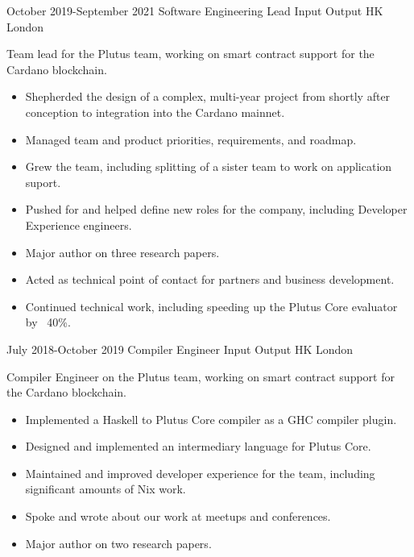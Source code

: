 \documentclass[12pt,a4paper,sans]{moderncv}
\begin{document}
\cventry
{October 2019-September 2021}
{Software Engineering Lead}
{Input Output HK}
{London}
{}
{
  Team lead for the Plutus team, working on smart contract support for the Cardano blockchain.
  \begin{itemize}
    \item Shepherded the design of a complex, multi-year project from shortly after conception to integration into the Cardano mainnet.
    \item Managed team and product priorities, requirements, and roadmap.
    \item Grew the team, including splitting of a sister team to work on application suport.
    \item Pushed for and helped define new roles for the company, including Developer Experience engineers.
    \item Major author on three research papers.
    \item Acted as technical point of contact for partners and business development.
    \item Continued technical work, including speeding up the Plutus Core evaluator by ~40\%.
  \end{itemize}
}

\cventry
{July 2018-October 2019}
{Compiler Engineer}
{Input Output HK}
{London}
{}
{
  Compiler Engineer on the Plutus team, working on smart contract support for the Cardano blockchain.
  \begin{itemize}
    \item Implemented a Haskell to Plutus Core compiler as a GHC compiler plugin.
    \item Designed and implemented an intermediary language for Plutus Core.
    \item Maintained and improved developer experience for the team, including significant amounts of Nix work.
    \item Spoke and wrote about our work at meetups and conferences.
    \item Major author on two research papers.
  \end{itemize}
}
\end{document}
